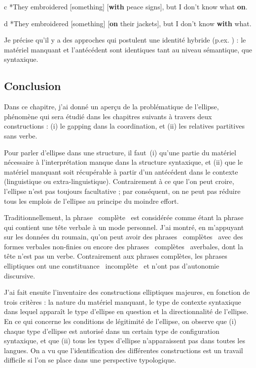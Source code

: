   c  *They embroidered [something] [\textbf{with} peace signs], but I don't know what \textbf{on}.

  d  *They embroidered [something] [\textbf{on} their jackets], but I don't know \textbf{with} what. 

Je précise qu'il y a des approches qui postulent une identité hybride (p.ex. \citet{Kehler2002}) : le matériel manquant et l'antécédent sont identiques tant au niveau sémantique, que syntaxique. 

\subsection{Conclusion } 
Dans ce chapitre, j'ai donné un aperçu de la problématique de l'ellipse, phénomène qui sera étudié dans les chapitres suivants à travers deux constructions : (i) le gapping dans la coordination, et (ii) les relatives partitives sans verbe. 

Pour parler d'ellipse dans une structure, il faut~(i) qu'une partie du matériel nécessaire à l'interprétation manque dans la structure syntaxique, et (ii) que le matériel manquant soit récupérable à partir d'un antécédent dans le contexte (linguistique ou extra-linguistique). Contrairement à ce que l'on peut croire, l'ellipse n'est pas toujours facultative ; par conséquent, on ne peut pas réduire tous les emplois de l'ellipse au principe du moindre effort.  

Traditionnellement, la phrase {\guillemotleft}~complète~{\guillemotright} est considérée comme étant la phrase qui contient une tête verbale à un mode personnel. J'ai montré, en m'appuyant sur les données du roumain, qu'on peut avoir des phrases {\guillemotleft}~complètes~{\guillemotright} avec des formes verbales non-finies ou encore des phrases {\guillemotleft}~complètes~{\guillemotright} averbales, dont la tête n'est pas un verbe. Contrairement aux phrases complètes, les phrases elliptiques ont une constituance {\guillemotleft}~incomplète~{\guillemotright} et n'ont pas d'autonomie discursive.

J'ai fait ensuite l'inventaire des constructions elliptiques majeures, en fonction de trois critères : la nature du matériel manquant, le type de contexte syntaxique dans lequel apparaît le type d'ellipse en question et la directionnalité de l'ellipse. En ce qui concerne les conditions de légitimité de l'ellipse, on observe que (i) chaque type d'ellipse est autorisé dans un certain type de configuration syntaxique, et que (ii) tous les types d'ellipse n'apparaissent pas dans toutes les langues. On a vu que l'identification des différentes constructions est un travail difficile si l'on se place dans une perspective typologique.  


